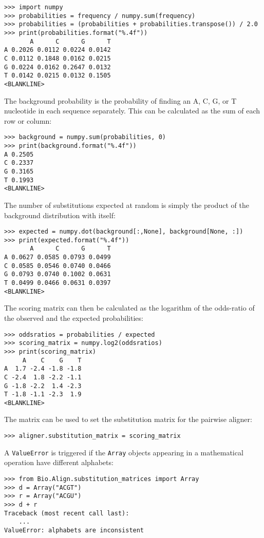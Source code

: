 \begin{verbatim}
>>> import numpy
>>> probabilities = frequency / numpy.sum(frequency)
>>> probabilities = (probabilities + probabilities.transpose()) / 2.0
>>> print(probabilities.format("%.4f"))
       A      C      G      T
A 0.2026 0.0112 0.0224 0.0142
C 0.0112 0.1848 0.0162 0.0215
G 0.0224 0.0162 0.2647 0.0132
T 0.0142 0.0215 0.0132 0.1505
<BLANKLINE>
\end{verbatim}
The background probability is the probability of finding an A, C, G, or T nucleotide in each sequence separately. This can be calculated as the sum of each row or column:

\begin{verbatim}
>>> background = numpy.sum(probabilities, 0)
>>> print(background.format("%.4f"))
A 0.2505
C 0.2337
G 0.3165
T 0.1993
<BLANKLINE>
\end{verbatim}
The number of substitutions expected at random is simply the product of the background distribution with itself:

\begin{verbatim}
>>> expected = numpy.dot(background[:,None], background[None, :])
>>> print(expected.format("%.4f"))
       A      C      G      T
A 0.0627 0.0585 0.0793 0.0499
C 0.0585 0.0546 0.0740 0.0466
G 0.0793 0.0740 0.1002 0.0631
T 0.0499 0.0466 0.0631 0.0397
<BLANKLINE>
\end{verbatim}
The scoring matrix can then be calculated as the logarithm of the odds-ratio of the observed and the expected probabilities:

\begin{verbatim}
>>> oddsratios = probabilities / expected
>>> scoring_matrix = numpy.log2(oddsratios)
>>> print(scoring_matrix)
     A    C    G    T
A  1.7 -2.4 -1.8 -1.8
C -2.4  1.8 -2.2 -1.1
G -1.8 -2.2  1.4 -2.3
T -1.8 -1.1 -2.3  1.9
<BLANKLINE>
\end{verbatim}
The matrix can be used to set the substitution matrix for the pairwise aligner:

\begin{verbatim}
>>> aligner.substitution_matrix = scoring_matrix
\end{verbatim}

A \verb+ValueError+ is triggered if the \verb+Array+ objects appearing in a mathematical operation have different alphabets:

\begin{verbatim}
>>> from Bio.Align.substitution_matrices import Array
>>> d = Array("ACGT")
>>> r = Array("ACGU")
>>> d + r
Traceback (most recent call last):
    ...
ValueError: alphabets are inconsistent
\end{verbatim}

